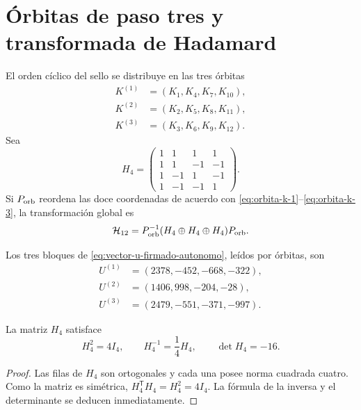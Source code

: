 \section{Órbitas de paso tres y transformada de Hadamard}

El orden cíclico del sello se distribuye en las tres órbitas
\begin{align}
 K^{(1)}&=(K_1,K_4,K_7,K_{10}),
 \label{eq:orbita-k-1}\\
 K^{(2)}&=(K_2,K_5,K_8,K_{11}),
 \label{eq:orbita-k-2}\\
 K^{(3)}&=(K_3,K_6,K_9,K_{12}).
 \label{eq:orbita-k-3}
\end{align}
Sea
\begin{equation}
 H_4=
 \begin{pmatrix}
 1&1&1&1\\
 1&1&-1&-1\\
 1&-1&1&-1\\
 1&-1&-1&1
 \end{pmatrix}.
 \label{eq:matriz-hadamard-cuatro-autonoma}
\end{equation}
Si \(P_{\rm orb}\) reordena las doce coordenadas de acuerdo con
\eqref{eq:orbita-k-1}--\eqref{eq:orbita-k-3}, la transformación global es
\begin{equation}
 \mathcal H_{12}
 =P_{\rm orb}^{-1}
 (H_4\oplus H_4\oplus H_4)P_{\rm orb}.
 \label{eq:hadamard-global-doce}
\end{equation}

Los tres bloques de \eqref{eq:vector-u-firmado-autonomo}, leídos por
órbitas, son
\begin{align*}
 U^{(1)}&=(2378,-452,-668,-322),\\
 U^{(2)}&=(1406,998,-204,-28),\\
 U^{(3)}&=(2479,-551,-371,-997).
\end{align*}

\begin{lemma}
\label{lem:cuarto-inversa-hadamard}
La matriz \(H_4\) satisface
\begin{equation}
 H_4^2=4I_4,
 \qquad
 H_4^{-1}=\frac14H_4,
 \qquad
 \det H_4=-16.
 \label{eq:identidades-hadamard-cuatro}
\end{equation}
\end{lemma}

\begin{proof}
Las filas de \(H_4\) son ortogonales y cada una posee norma cuadrada cuatro.
Como la matriz es simétrica, \(H_4^{\mathsf T}H_4=H_4^2=4I_4\). La
fórmula de la inversa y el determinante se deducen inmediatamente.
\end{proof}

